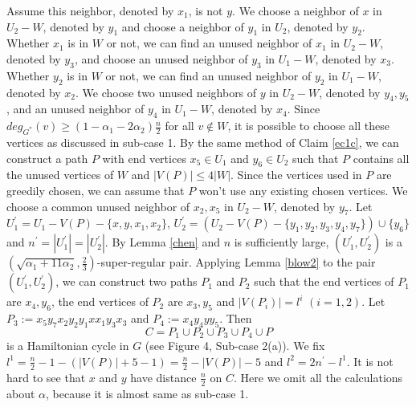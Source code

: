 \documentclass[11pt]{article}
\begin{document}
Assume this neighbor, denoted by $x_1$, is not $y$. We choose a neighbor of $x$ in $U_2-W$, denoted by $y_1$ and choose a neighbor of $y_1$ in $U_2$, denoted by $y_2$. Whether $x_1$ is in $W$ or not, we can find an unused neighbor of $x_1$ in $U_2-W$, denoted by $y_3$, and choose an unused neighbor of $y_3$ in $U_1-W$, denoted by $x_3$. Whether $y_2$ is in $W$ or not, we can find an unused neighbor of $y_2$ in $U_1-W$, denoted by $x_2$. We choose two unused neighbors of $y$ in $U_2-W$, denoted by $y_4,y_5$, and an unused neighbor of $y_4$ in $U_1-W$, denoted by $x_4$. Since $deg_{G^*}(v)\geq (1-\alpha_1-2\alpha_2)\frac{n}{2}$ for all $v\not \in W$, it is possible to choose all these vertices as discussed in sub-case 1. By the same method of Claim \ref{ec1c}, we can construct a path $P$ with end vertices $x_5\in U_1$ and $y_6\in U_2$ such that $P$ contains all the unused vertices of $W$ and $|V(P)|\leq 4|W|$. Since the vertices used in $P$ are greedily chosen, we can assume that $P$ won't use any existing chosen vertices. We choose a common unused neighbor of $x_2,x_5$ in $U_2-W$, denoted by $y_7$. Let $U_1^{'}=U_1-V(P)-\{x,y,x_1,x_2\}$, $U_2^{'}=(U_2-V(P)-\{y_1,y_2,y_3,y_4,y_7\})\cup \{y_6\}$ and $n^{'}=|U_1^{'}|=|U_2^{'}|$. By Lemma \ref{chen} and $n$ is sufficiently large, $(U_1^{'},U_2^{'})$ is a $(\sqrt{\alpha_1+11\alpha_2},\frac{2}{3})$-super-regular pair. Applying Lemma \ref{blow2} to the pair $(U_1^{'},U_2^{'})$, we can construct two paths $P_1$ and $P_2$ such that the end vertices of $P_1$ are $x_4, y_6$, the end vertices of $P_2$ are $x_3, y_5$ and $|V(P_i)|=l^i$ $(i=1,2)$. Let $P_3:=x_5y_7x_2y_2y_1xx_1y_3x_3$ and $P_4:=x_4y_4yy_5$. Then
$$C=P_1\cup P_2\cup P_3\cup P_4\cup P$$
is a Hamiltonian cycle in $G$ (see Figure 4, Sub-case 2(a)). We fix $l^1=\frac{n}{2}-1-(|V(P)|+5-1)=\frac{n}{2}-|V(P)|-5$ and $l^2=2n^{'}-l^1$. It is not hard to see that $x$ and $y$ have distance $\frac{n}{2}$ on $C$. Here we omit all the calculations about $\alpha$, because it is almost same as sub-case 1.
\end{document}

